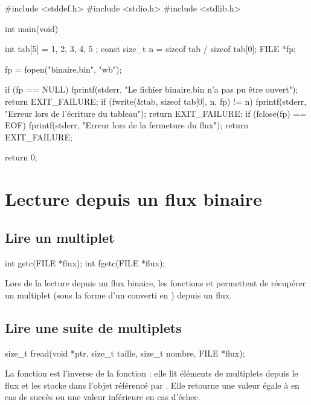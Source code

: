 \begin{C}
#include <stddef.h>
#include <stdio.h>
#include <stdlib.h>


int main(void)
{
    int tab[5] = { 1, 2, 3, 4, 5 };
    const size_t n = sizeof tab / sizeof tab[0];
    FILE *fp;

    fp = fopen("binaire.bin", "wb");

    if (fp == NULL)
    {
        fprintf(stderr, "Le fichier binaire.bin n'a pas pu être ouvert\n");
        return EXIT_FAILURE;
    }
    if (fwrite(&tab, sizeof tab[0], n, fp) != n)
    {
            fprintf(stderr, "Erreur lors de l'écriture du tableau\n");
            return EXIT_FAILURE;
    }
    if (fclose(fp) == EOF)
    {
        fprintf(stderr, "Erreur lors de la fermeture du flux\n");
        return EXIT_FAILURE;        
    }

    return 0;
}
\end{C}
 
\section{Lecture depuis un flux binaire}
\label{lecture-depuis-un-flux-binaire}
  
\subsection{Lire un multiplet}
\label{lire-un-multiplet}

\begin{C}
int getc(FILE *flux);
int fgetc(FILE *flux);
\end{C}

Lors de la lecture depuis un flux binaire, les fonctions
 et  permettent de récupérer un multiplet
(sous la forme d'un  converti en )
depuis un flux.

\subsection{Lire une suite de multiplets}
\label{lire-une-suite-de-multiplets}

\begin{C}
size_t fread(void *ptr, size_t taille, size_t nombre, FILE *flux);
\end{C}

La fonction  est l'inverse de la fonction
 : elle lit  éléments de 
multiplets depuis le flux  et les stocke dans l'objet
référencé par . Elle retourne une valeur égale à
 en cas de succès ou une valeur inférieure en cas
d'échec.

